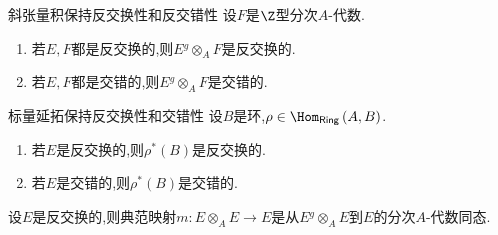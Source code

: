 \begin{proposition}{斜张量积保持反交换性和反交错性}{}
	设$F$是$\Z$型分次$A$-代数.
	\begin{enumerate}
		\item 若$E,F$都是反交换的,则$E{}^{g}\otimes_{A}F$是反交换的.
		\item 若$E,F$都是交错的,则$E{}^{g}\otimes_{A}F$是交错的.
	\end{enumerate}
\end{proposition}

\begin{corollary}{标量延拓保持反交换性和交错性}{}
	设$B$是环,$\rho\in\Hom_{\mathsf{Ring}}\left(A,B\right)$.
	\begin{enumerate}
		\item 若$E$是反交换的,则$\rho^{\ast}\left(B\right)$是反交换的.
		\item 若$E$是交错的,则$\rho^{\ast}\left(B\right)$是交错的.
	\end{enumerate}
\end{corollary}

\begin{remark}{}{}
	设$E$是反交换的,则典范映射$m:E\otimes_{A}E\to E$是从$E{}^{g}\otimes_{A}E$到$E$的分次$A$-代数同态.
\end{remark}















































